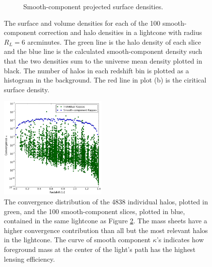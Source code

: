 \documentclass[%
 reprint,
 amsmath,amssymb,
 aps,nofootinbib
]{revtex4-1}
\begin{document}
\begin{figure}
\begin{subfigure}[H]{0.48\textwidth}
        \caption{Smooth-component projected surface densities.}
        \label{fig:surface_densities}
    \end{subfigure}
    \captionsetup{justification=raggedright,singlelinecheck=false}
    \caption{The surface and volume densities for each of the 100 smooth-component correction and halo densities in a lightcone with radius $R_L=6$ arcminutes. The green line is the halo density of each slice and the blue line is the calculated smooth-component density such that the two densities sum to the universe mean density plotted in black. The number of halos in each redshift bin is plotted as a histogram in the background. The red line in plot (b) is the ciritical surface density.}
    \label{densities}
\end{figure}

\begin{figure}
    \centering
    \includegraphics[width=0.475\textwidth]{figs-swe/thesis/kappa_distribution.png}
    \captionsetup{justification=raggedright,singlelinecheck=false}
    \caption{The convergence distribution of the 4838 individual halos, plotted in green, and the 100 smooth-component slices, plotted in blue, contained in the same lightcone as Figure \ref{densities}. The mass sheets have a higher convergence contribution than all but the most relevant halos in the lightcone. The curve of smooth component $\kappa$'s indicates how foreground mass at the center of the light's path has the highest lensing efficiency.}
    \label{fig:kappa_dist}
\end{figure}
\end{document}
